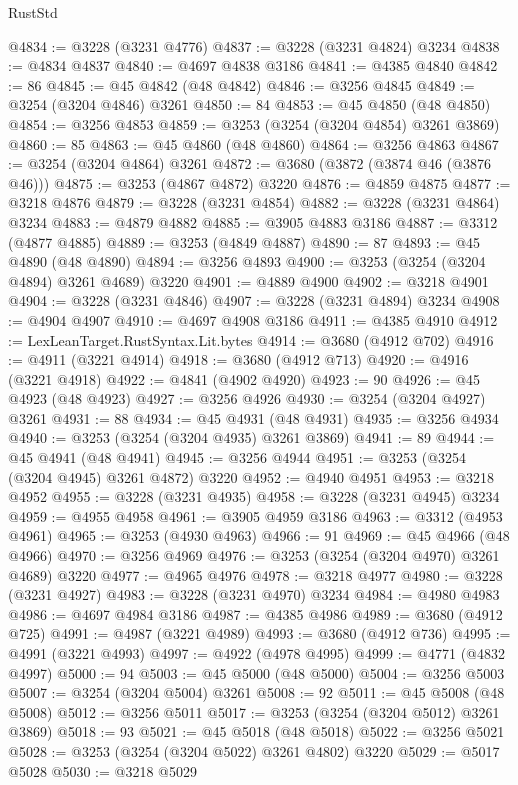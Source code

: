 \begin{lexlean}{RustStd}
\begin{coremodule}
@4834 := @3228 (@3231 @4776)
@4837 := @3228 (@3231 @4824) @3234
@4838 := @4834 @4837
@4840 := @4697 @4838 @3186
@4841 := @4385 @4840
@4842 := 86
@4845 := @45 @4842 (@48 @4842)
@4846 := @3256 @4845
@4849 := @3254 (@3204 @4846) @3261
@4850 := 84
@4853 := @45 @4850 (@48 @4850)
@4854 := @3256 @4853
@4859 := @3253 (@3254 (@3204 @4854) @3261 @3869)
@4860 := 85
@4863 := @45 @4860 (@48 @4860)
@4864 := @3256 @4863
@4867 := @3254 (@3204 @4864) @3261
@4872 := @3680 (@3872 (@3874 @46 (@3876 @46)))
@4875 := @3253 (@4867 @4872) @3220
@4876 := @4859 @4875
@4877 := @3218 @4876
@4879 := @3228 (@3231 @4854)
@4882 := @3228 (@3231 @4864) @3234
@4883 := @4879 @4882
@4885 := @3905 @4883 @3186
@4887 := @3312 (@4877 @4885)
@4889 := @3253 (@4849 @4887)
@4890 := 87
@4893 := @45 @4890 (@48 @4890)
@4894 := @3256 @4893
@4900 := @3253 (@3254 (@3204 @4894) @3261 @4689) @3220
@4901 := @4889 @4900
@4902 := @3218 @4901
@4904 := @3228 (@3231 @4846)
@4907 := @3228 (@3231 @4894) @3234
@4908 := @4904 @4907
@4910 := @4697 @4908 @3186
@4911 := @4385 @4910
@4912 := LexLeanTarget.RustSyntax.Lit.bytes
@4914 := @3680 (@4912 @702)
@4916 := @4911 (@3221 @4914)
@4918 := @3680 (@4912 @713)
@4920 := @4916 (@3221 @4918)
@4922 := @4841 (@4902 @4920)
@4923 := 90
@4926 := @45 @4923 (@48 @4923)
@4927 := @3256 @4926
@4930 := @3254 (@3204 @4927) @3261
@4931 := 88
@4934 := @45 @4931 (@48 @4931)
@4935 := @3256 @4934
@4940 := @3253 (@3254 (@3204 @4935) @3261 @3869)
@4941 := 89
@4944 := @45 @4941 (@48 @4941)
@4945 := @3256 @4944
@4951 := @3253 (@3254 (@3204 @4945) @3261 @4872) @3220
@4952 := @4940 @4951
@4953 := @3218 @4952
@4955 := @3228 (@3231 @4935)
@4958 := @3228 (@3231 @4945) @3234
@4959 := @4955 @4958
@4961 := @3905 @4959 @3186
@4963 := @3312 (@4953 @4961)
@4965 := @3253 (@4930 @4963)
@4966 := 91
@4969 := @45 @4966 (@48 @4966)
@4970 := @3256 @4969
@4976 := @3253 (@3254 (@3204 @4970) @3261 @4689) @3220
@4977 := @4965 @4976
@4978 := @3218 @4977
@4980 := @3228 (@3231 @4927)
@4983 := @3228 (@3231 @4970) @3234
@4984 := @4980 @4983
@4986 := @4697 @4984 @3186
@4987 := @4385 @4986
@4989 := @3680 (@4912 @725)
@4991 := @4987 (@3221 @4989)
@4993 := @3680 (@4912 @736)
@4995 := @4991 (@3221 @4993)
@4997 := @4922 (@4978 @4995)
@4999 := @4771 (@4832 @4997)
@5000 := 94
@5003 := @45 @5000 (@48 @5000)
@5004 := @3256 @5003
@5007 := @3254 (@3204 @5004) @3261
@5008 := 92
@5011 := @45 @5008 (@48 @5008)
@5012 := @3256 @5011
@5017 := @3253 (@3254 (@3204 @5012) @3261 @3869)
@5018 := 93
@5021 := @45 @5018 (@48 @5018)
@5022 := @3256 @5021
@5028 := @3253 (@3254 (@3204 @5022) @3261 @4802) @3220
@5029 := @5017 @5028
@5030 := @3218 @5029

\end{coremodule}
\end{lexlean}
